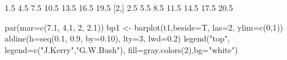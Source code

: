 \begin{Schunk}
\begin{Soutput}
     [,1] [,2] [,3] [,4] [,5] [,6] [,7]
[1,]  1.5  4.5  7.5 10.5 13.5 16.5 19.5
[2,]  2.5  5.5  8.5 11.5 14.5 17.5 20.5
\end{Soutput}
\end{Schunk}
\begin{Schunk}
\begin{Sinput}
 par(mar=c(7.1, 4.1, 2, 2.1))
 bp1 <- barplot(t1,beside=T, las=2, ylim=c(0,1))
 abline(h=seq(0.1, 0.9, by=0.10), lty=3,  lwd=0.2)
 legend("top", legend=c("J.Kerry","G.W.Bush"), fill=gray.colors(2),bg="white")
\end{Sinput}
\end{Schunk}
